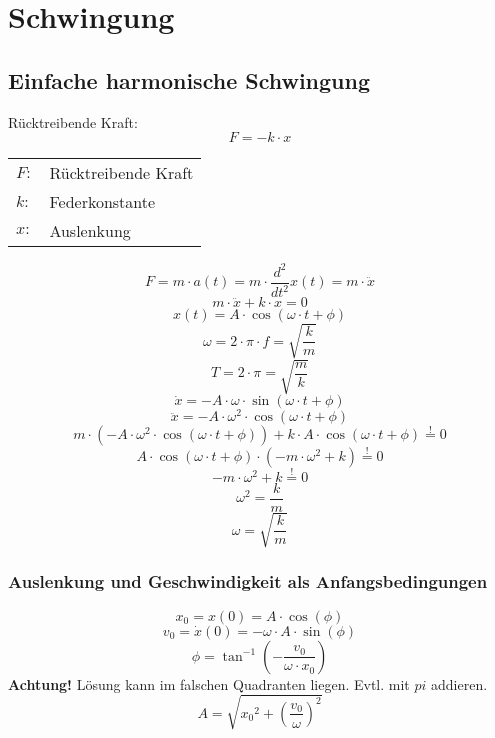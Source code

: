 



\chapter{Schwingung}
\section{Einfache harmonische Schwingung}
Rücktreibende Kraft: 
\[ \boxed{F = - k \cdot x} \]
\begin{tabular}{ll}
$F:$ & Rücktreibende Kraft \\
$k:$ & Federkonstante \\
$x:$ & Auslenkung
\end{tabular}
\[ \boxed{F = m \cdot a(t) = m \cdot \frac{d^2}{d t^2}x(t) = m \cdot \ddot{x}} \]
\[ \boxed{m \cdot \ddot{x} + k \cdot x = 0} \]
\[ \boxed{x(t) = A \cdot \cos(\omega \cdot t + \phi)} \]
\[ \boxed{\omega = 2 \cdot \pi \cdot f = \sqrt{\frac{k}{m}}} \]
\[ \boxed{T = 2 \cdot \pi = \sqrt{\frac{m}{k}}} \]
\[ \boxed{\dot{x} = - A \cdot \omega \cdot \sin(\omega \cdot t + \phi)} \]
\[ \boxed{\ddot{x} = - A \cdot \omega^2 \cdot \cos(\omega \cdot t + \phi)} \]
\[ \boxed{m \cdot (-A \cdot \omega^2 \cdot \cos(\omega \cdot t + \phi)) 
+ k \cdot A \cdot \cos(\omega \cdot t + \phi) \stackrel{!}{=} 0} \]
\[ \boxed{A \cdot \cos(\omega \cdot t + \phi) \cdot (-m \cdot  \omega^2 + k) 
\stackrel{!}{=} 0} \]
\[ \boxed{-m \cdot  \omega^2 + k \stackrel{!}{=} 0} \]
\[ \boxed{\omega^2 = \frac{k}{m}} \]
\[ \boxed{\omega = \sqrt{\frac{k}{m}}} \]

\subsection{Auslenkung und Geschwindigkeit als Anfangsbedingungen}
\[ \boxed{x_0 = x(0) = A \cdot \cos(\phi)} \]
\[ \boxed{v_0 = \dot{x}(0) = - \omega \cdot A \cdot \sin(\phi)} \]
\[ \boxed{\phi = \tan^{-1}\left(-\frac{v_0}{\omega \cdot x_0}\right)} \]
\textbf{Achtung!} Lösung kann im falschen Quadranten liegen. 
Evtl. mit $pi$ addieren. 
\[ \boxed{A = \sqrt{{x_0}^2 + \left(\frac{v_0}{\omega}\right)^2}} \]

